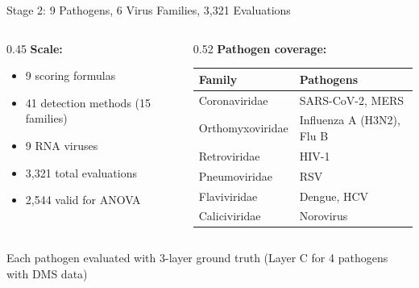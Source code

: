 \documentclass[aspectratio=169,11pt]{beamer}
\begin{document}
\begin{frame}{\textcolor{stage2orange}{Stage 2:} 9 Pathogens, 6 Virus Families, 3,321 Evaluations}

\begin{columns}[T]
\begin{column}{0.45\textwidth}
\textbf{Scale:}
\begin{itemize}
  \item 9 scoring formulas
  \item 41 detection methods (15 families)
  \item 9 RNA viruses
  \item \alert{3,321} total evaluations
  \item \alert{2,544} valid for ANOVA
\end{itemize}
\end{column}

\begin{column}{0.52\textwidth}
\textbf{Pathogen coverage:}\\[0.3em]
\footnotesize
\begin{tabular}{ll}
\toprule
\textbf{Family} & \textbf{Pathogens} \\
\midrule
Coronaviridae & SARS-CoV-2, MERS \\
Orthomyxoviridae & Influenza A (H3N2), Flu B \\
Retroviridae & HIV-1 \\
Pneumoviridae & RSV \\
Flaviviridae & Dengue, HCV \\
Caliciviridae & Norovirus \\
\bottomrule
\end{tabular}
\end{column}
\end{columns}

\vspace{0.5em}
\begin{center}
{\footnotesize Each pathogen evaluated with 3-layer ground truth (Layer C for 4 pathogens with DMS data)}
\end{center}
\end{frame}
\end{document}
